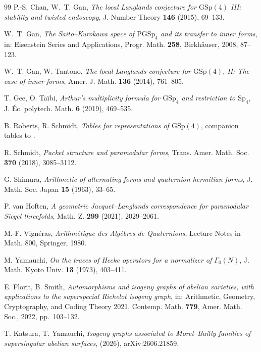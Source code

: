 \documentclass[11pt]{amsart}
\theoremstyle{plain}
\theoremstyle{definition}
\newcommand{\GSp}{\mathrm{GSp}}
\begin{document}
\begin{thebibliography}{99}
		 P.-S. Chan, W.~T. Gan, \emph{The local Langlands
			conjecture for $\GSp(4)$ III: stability and twisted endoscopy}, J.
		Number Theory \textbf{146} (2015), 69--133.
		
		 W.~T. Gan, \emph{The Saito--Kurokawa space of
			$\mathrm{PGSp}_4$ and its transfer to inner forms}, in: Eisenstein
		Series and Applications, Progr. Math. \textbf{258}, Birkh\"auser,
		2008, 87--123.
		
		 W.~T. Gan, W. Tantono, \emph{The local Langlands
			conjecture for $\mathrm{GSp}(4)$, II: The case of inner forms}, Amer. J.
		Math. \textbf{136} (2014), 761--805.
		
		 T. Gee, O. Ta\"ibi, \emph{Arthur's multiplicity formula
			for $\mathrm{GSp}_4$ and restriction to $\mathrm{Sp}_4$}, J. \'Ec. polytech.
		Math. \textbf{6} (2019), 469--535.
		
		 B. Roberts, R. Schmidt, \emph{Tables for
			representations of $\mathrm{GSp}(4)$}, companion tables to
		\cite{RobertsSchmidt}.
		
		 R. Schmidt, \emph{Packet structure and paramodular forms},
		Trans. Amer. Math. Soc. \textbf{370} (2018), 3085--3112.
		
		 G. Shimura, \emph{Arithmetic of alternating forms and
			quaternion hermitian forms}, J. Math. Soc. Japan \textbf{15} (1963), 33--65.
		
		 P. van Hoften, \emph{A geometric Jacquet--Langlands
			correspondence for paramodular Siegel threefolds}, Math. Z. \textbf{299}
		(2021), 2029--2061.
		
		 M.-F. Vign\'eras, \emph{Arithm\'etique des Alg\`ebres de
			Quaternions}, Lecture Notes in Math. 800, Springer, 1980.
		
		 M. Yamauchi, \emph{On the traces of Hecke operators
			for a normalizer of $\Gamma_0(N)$}, J. Math. Kyoto Univ. \textbf{13} (1973),
		403--411.
		
		 E. Florit, B. Smith, \emph{Automorphisms and isogeny
			graphs of abelian varieties, with applications to the superspecial Richelot
			isogeny graph}, in: Arithmetic, Geometry, Cryptography, and Coding Theory 2021,
		Contemp. Math. \textbf{779}, Amer. Math. Soc., 2022, pp.~103--132.
		
		 T. Katsura, T. Yamauchi, \emph{Isogeny graphs
			associated to Moret--Bailly families of supersingular abelian surfaces}, (2026),
		arXiv:2606.21859.
		

\end{thebibliography}
\end{document}
